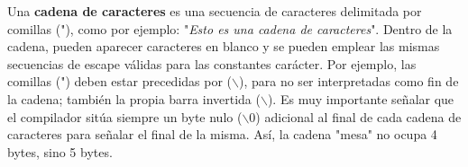 Una \textbf{cadena de caracteres} es una secuencia de caracteres delimitada por comillas ("), como por
ejemplo: "\emph{Esto es una cadena de caracteres}". Dentro de la cadena, pueden aparecer caracteres en blanco y se pueden emplear las mismas secuencias de escape válidas para las constantes carácter. Por ejemplo, las comillas (") deben estar precedidas por ($\backslash$), para no ser interpretadas
como fin de la cadena; también la propia barra invertida ($\backslash$). Es muy importante señalar que el
compilador sitúa siempre un byte nulo ($\backslash$0) adicional al final de cada cadena de caracteres para
señalar el final de la misma. Así, la cadena "mesa" no ocupa 4 bytes, sino 5 bytes.